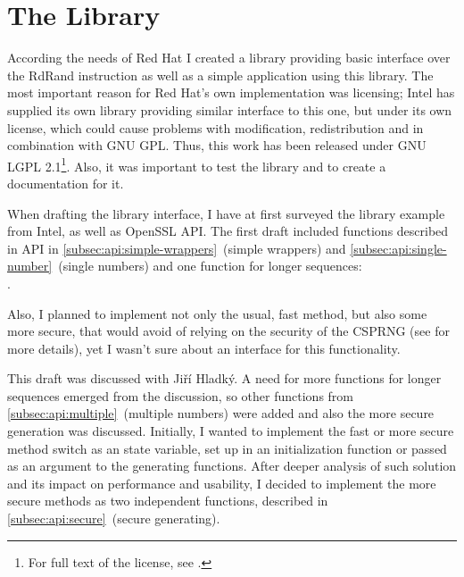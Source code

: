 \chapter{The Library}\label{chap:library}
\par{
According the needs of Red Hat I created a library providing basic interface over the RdRand instruction as well as a simple application using this library. The most important reason for Red Hat's own implementation was licensing; Intel has supplied its own library providing similar interface to this one, but under its own license, which could cause problems with modification, redistribution and in combination with GNU GPL. Thus, this work has been released under GNU LGPL 2.1\footnote{For full text of the license, see \cite{GNULGPL}.}. Also, it was important to test the library and to create a documentation for it.
}

\par{
When drafting the library interface, I have at first surveyed the library example from Intel\cite{IntelDRNGGuide}, as well as OpenSSL API\cite{OpenSSLAPI}. The first draft included functions described in API in \ref{subsec:api:simple-wrappers}~(simple wrappers) and \ref{subsec:api:single-number}~(single numbers) and one function for longer sequences: \\. 
}

\par{
Also, I planned to implement not only the usual, fast method, but also some more secure, that would avoid of relying on the security of the CSPRNG (see  for more details), yet I wasn't sure about an interface for this functionality.
}

\par{
This draft was discussed with Jiří Hladký. A need for more functions for longer sequences emerged from the discussion, so other functions from \ref{subsec:api:multiple}~(multiple numbers) were added and also the more secure generation was discussed. Initially, I wanted to implement the fast or more secure method switch as an state variable, set up in an initialization function or passed as an argument to the generating functions. After deeper analysis of such solution and its impact on performance and usability, I decided to implement the more secure methods as two independent functions, described in \ref{subsec:api:secure}~(secure generating). 
}


